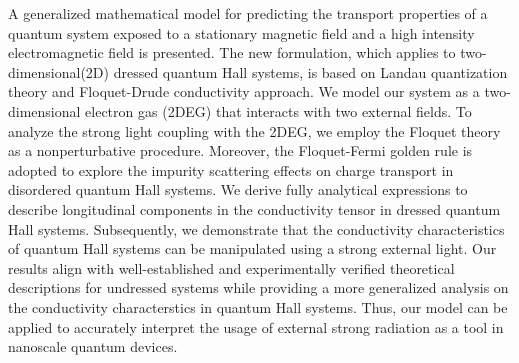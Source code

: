 A generalized mathematical model for predicting the transport properties of a quantum system exposed to a stationary magnetic field and a high intensity electromagnetic field is presented.
The new formulation, which applies to two-dimensional(2D) dressed quantum Hall systems, is based on Landau quantization theory and Floquet-Drude conductivity approach.
We model our system as a two-dimensional electron gas (2DEG) that interacts with two external fields. To analyze the strong light coupling with the 2DEG, we employ the Floquet theory as a nonperturbative procedure.
Moreover, the Floquet-Fermi golden rule is adopted to explore the impurity scattering effects on charge transport in disordered quantum Hall systems.
We derive fully analytical expressions to describe longitudinal components in the conductivity tensor in dressed quantum Hall systems. Subsequently, we demonstrate that the conductivity characteristics of quantum Hall systems can be manipulated using a strong external light.
Our results align with well-established and experimentally
verified theoretical descriptions for undressed systems while providing a more generalized analysis on the conductivity characterstics in quantum Hall systems.
Thus, our model can be applied to accurately interpret the usage of external strong radiation as a tool in nanoscale quantum devices.
